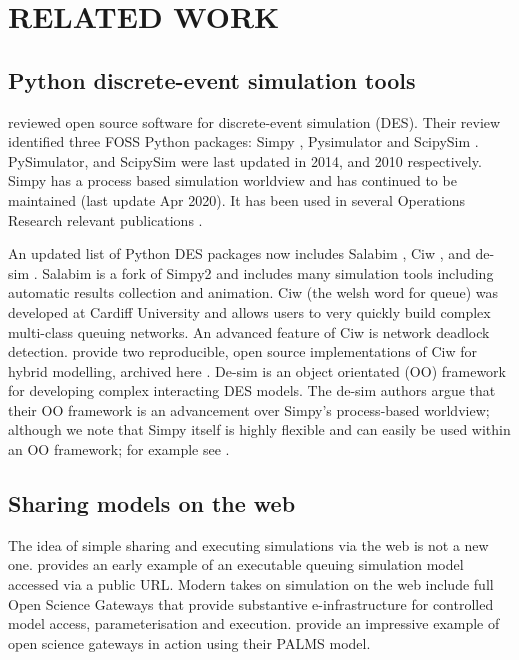 \documentclass{swpaperproc}
\theoremstyle{sw}
\begin{document}
\section{RELATED WORK}
\subsection{Python discrete-event simulation tools}

 reviewed open source software for discrete-event simulation (DES). Their review identified three FOSS Python packages: Simpy \cite{simpy}, Pysimulator \cite{pfeiffer2012pysimulator} and ScipySim \cite{mcinnes2011scipysim}. PySimulator, and ScipySim were last updated in 2014, and 2010 respectively. Simpy has a process based simulation worldview and has continued to be maintained (last update Apr 2020). It has been used in several Operations Research relevant publications \cite{bovim_simulating_2021,allen_simulation_2020,monks2022open}. 

An updated list of Python DES packages now includes Salabim \cite[MIT licensed, last updated Apr 2022]{van2018salabim}, Ciw \cite[MIT licensed; last updated Oct 2022]{ciw}, and de-sim \cite[MIT licensed, last updated Nov, 2020]{goldberg2020sim}. Salabim is a fork of Simpy2 and includes many simulation tools including automatic results collection and animation.  Ciw (the welsh word for queue) was developed at Cardiff University and allows users to very quickly build complex multi-class queuing networks. An advanced feature of Ciw is network deadlock detection.  provide two reproducible, open source implementations of Ciw for hybrid modelling, archived here \cite{palmer_geraint_2021_4601529}.  De-sim is an object orientated (OO) framework for developing complex interacting DES models. The de-sim authors argue that their OO framework is an advancement over Simpy's process-based worldview; although we note that Simpy itself is highly flexible and can easily be used within an OO framework; for example see \cite{allen_simulation_2020}.

\subsection{Sharing models on the web}

The idea of simple sharing and executing simulations via the web is not a new one.  provides an early example of an executable queuing simulation model accessed via a public URL. Modern takes on simulation on the web include full Open Science Gateways that provide substantive e-infrastructure for controlled model access, parameterisation and execution.  provide an impressive example of open science gateways in action using their PALMS model. 
\end{document}
